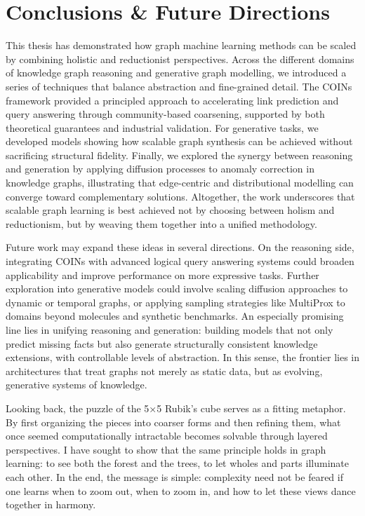 \chapter{Conclusions \& Future Directions}
\label{chp: conclusion}

This thesis has demonstrated how graph machine learning methods can be scaled by combining holistic and reductionist perspectives. Across the different domains of knowledge graph reasoning and generative graph modelling, we introduced a series of techniques that balance abstraction and fine-grained detail. The COINs framework provided a principled approach to accelerating link prediction and query answering through community-based coarsening, supported by both theoretical guarantees and industrial validation. For generative tasks, we developed models showing how scalable graph synthesis can be achieved without sacrificing structural fidelity. Finally, we explored the synergy between reasoning and generation by applying diffusion processes to anomaly correction in knowledge graphs, illustrating that edge-centric and distributional modelling can converge toward complementary solutions. Altogether, the work underscores that scalable graph learning is best achieved not by choosing between holism and reductionism, but by weaving them together into a unified methodology.

Future work may expand these ideas in several directions. On the reasoning side, integrating COINs with advanced logical query answering systems could broaden applicability and improve performance on more expressive tasks. Further exploration into generative models could involve scaling diffusion approaches to dynamic or temporal graphs, or applying sampling strategies like MultiProx to domains beyond molecules and synthetic benchmarks. An especially promising line lies in unifying reasoning and generation: building models that not only predict missing facts but also generate structurally consistent knowledge extensions, with controllable levels of abstraction. In this sense, the frontier lies in architectures that treat graphs not merely as static data, but as evolving, generative systems of knowledge.

Looking back, the puzzle of the 5×5 Rubik’s cube serves as a fitting metaphor. By first organizing the pieces into coarser forms and then refining them, what once seemed computationally intractable becomes solvable through layered perspectives. I have sought to show that the same principle holds in graph learning: to see both the forest and the trees, to let wholes and parts illuminate each other. In the end, the message is simple: complexity need not be feared if one learns when to zoom out, when to zoom in, and how to let these views dance together in harmony.